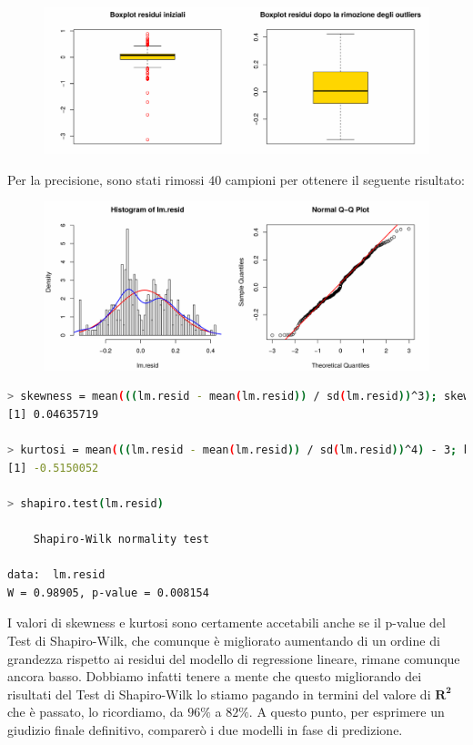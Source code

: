 \documentclass[11pt,a4paper]{article}
\begin{document}
\begin{figure}[H]
	\vspace{-1.3cm}
	\begin{center}
		\hspace*{-1.5cm}
		\includegraphics[scale=0.7]{imgs/residuals_boxplots_log.pdf}
	\end{center}
\end{figure}
\vspace{-1cm}\noindent
Per la precisione, sono stati rimossi $40$ campioni per ottenere il seguente
risultato:
\begin{figure}[H]
	\begin{center}
		\hspace*{-1.5cm}
		\includegraphics[scale=0.7]{imgs/residuals_2_log.pdf}
	\end{center}
\end{figure}
\vspace{-0.9cm}
\begin{lstlisting}[language=bash,basicstyle=\tiny,tabsize=2,frame = single]
> skewness = mean(((lm.resid - mean(lm.resid)) / sd(lm.resid))^3); skewness
[1] 0.04635719

> kurtosi = mean(((lm.resid - mean(lm.resid)) / sd(lm.resid))^4) - 3; kurtosi
[1] -0.5150052

> shapiro.test(lm.resid)

	Shapiro-Wilk normality test

data:  lm.resid
W = 0.98905, p-value = 0.008154
\end{lstlisting}
I valori di skewness e kurtosi sono certamente accetabili anche se il p-value
del Test di Shapiro-Wilk, che comunque \`e migliorato aumentando di un ordine di
grandezza rispetto ai residui del modello di regressione lineare, rimane
comunque ancora basso. Dobbiamo infatti tenere a mente che questo migliorando
dei risultati del Test di Shapiro-Wilk lo stiamo pagando in termini del valore
di $\boldsymbol{R^2}$ che \`e passato, lo ricordiamo, da $96\%$ a $82\%$. A
questo punto, per esprimere un giudizio finale definitivo, comparer\`o i due
modelli in fase di predizione.
\end{document}
